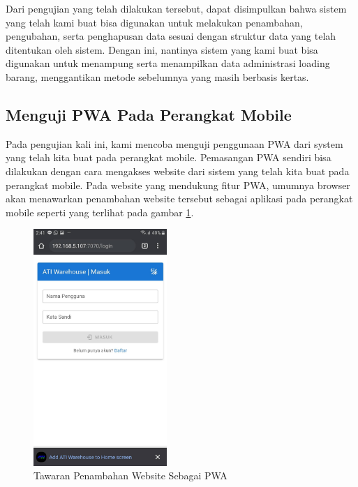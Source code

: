Dari pengujian yang telah dilakukan tersebut, dapat disimpulkan bahwa sistem yang telah kami buat bisa digunakan untuk melakukan penambahan, pengubahan, serta penghapusan data sesuai dengan struktur data yang telah ditentukan oleh sistem.
Dengan ini, nantinya sistem yang kami buat bisa digunakan untuk menampung serta menampilkan data administrasi loading barang, menggantikan metode sebelumnya yang masih berbasis kertas.
\vspace{0.5ex}

\subsection{Menguji PWA Pada Perangkat Mobile}
\vspace{1ex}

Pada pengujian kali ini, kami mencoba menguji penggunaan PWA dari system yang telah kita buat pada perangkat mobile.
Pemasangan PWA sendiri bisa dilakukan dengan cara mengakses website dari sistem yang telah kita buat pada perangkat mobile.
Pada website yang mendukung fitur PWA, umumnya browser akan menawarkan penambahan website tersebut sebagai aplikasi pada perangkat mobile seperti yang terlihat pada gambar \ref{fig:pasangPwa}.
\vspace{0.5ex}

\begin{figure} [ht!] \centering
  \includegraphics[width=0.45\textwidth]{gambar/pasang-pwa.jpg}
  \caption{Tawaran Penambahan Website Sebagai PWA}
	\label{fig:pasangPwa}
\end{figure}

